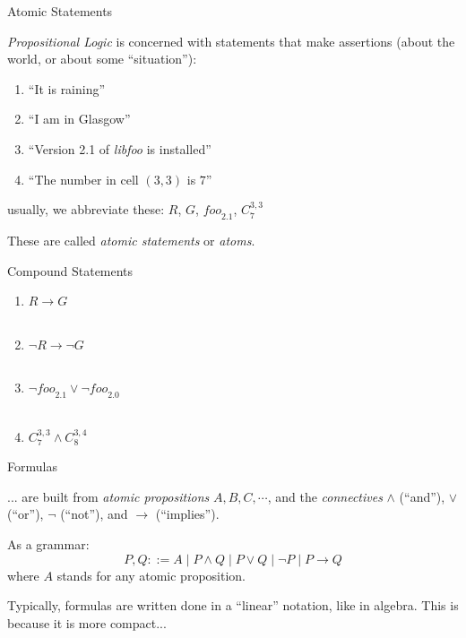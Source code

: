 \documentclass[xetex,aspectratio=169,14pt,hyperref={pdfpagelabels=true,pdflang={en-GB}}]{beamer}
\begin{document}
\frame{\titlepage}


\begin{frame}
  {Atomic Statements}

  \emph{Propositional Logic} is concerned with statements that make
  assertions (about the world, or about some ``situation''):
  \begin{enumerate}
  \item ``It is raining''
  \item ``I am in Glasgow''
  \item ``Version 2.1 of \emph{libfoo} is installed''
  \item ``The number in cell $(3,3)$ is $7$''
  \end{enumerate}
  usually, we abbreviate these: $R$, $G$, $\mathit{foo}_{2.1}$, $C^{3,3}_7$

  \medskip

  These are called \emph{atomic statements} or \emph{atoms}.

\end{frame}

\begin{frame}
  {Compound Statements}

  \begin{enumerate}
  \item $R \to G$ \\  \\
    \medskip
  \item $\lnot R \to \lnot G$ \\  \\
    \medskip
  \item $\lnot\mathit{foo}_{2.1} \lor \lnot\mathit{foo}_{2.0}$\\
     \\
    \medskip
  \item $C^{3,3}_7 \land C^{3,4}_8$\\
  \end{enumerate}
\end{frame}

\begin{frame}
  {Formulas}

  ... are built from \emph{atomic propositions} $A, B, C, \cdots$, and
  the \emph{connectives} $\land$ (``and''), $\lor$ (``or''), $\lnot$
  (``not''), and $\to$ (``implies'').

  \medskip

  As a grammar:
  \begin{displaymath}
    P, Q ::= A \mid P \land Q \mid P \lor Q \mid \lnot P \mid P \to Q
  \end{displaymath}
  where $A$ stands for any atomic proposition.

  \bigskip

  Typically, formulas are written done in a ``linear'' notation, like
  in algebra. This is because it is more compact...

\end{frame}
\end{document}
